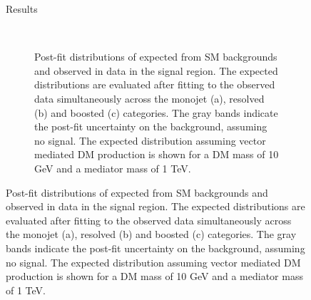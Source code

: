 \begin{figure}[hbtp]
\begin{section}{Results}
\begin{figure}[hbtp]\begin{center} 
\\
\caption{ Post-fit distributions of \ETm expected from SM backgrounds and
observed in data in the signal region. The expected distributions are evaluated
after fitting to the observed data simultaneously across the monojet (a),
resolved (b) and boosted (c) categories.  The gray bands indicate the post-fit
uncertainty on the background, assuming no signal. The expected distribution
assuming vector mediated DM production is shown for a DM mass of 10 GeV and a
mediator mass of 1 TeV.  } \label{fig:post_fit_plots}\end{center}\end{figure}


\end{section}
\end{figure}
